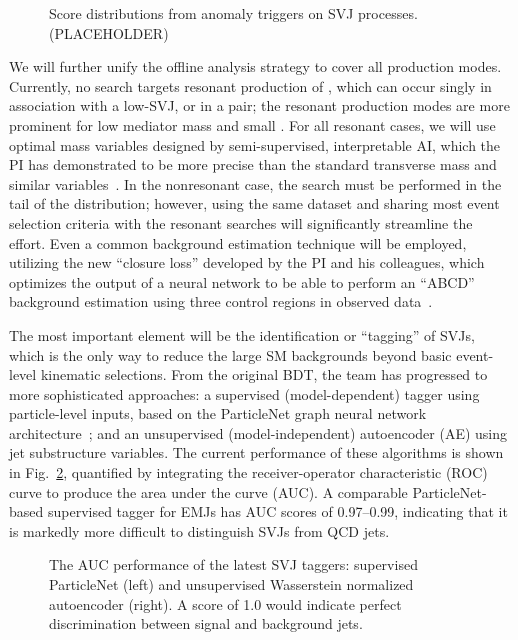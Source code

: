 \begin{figure}[htb!]
\centering
{}
\caption{Score distributions from anomaly triggers on SVJ processes. (PLACEHOLDER)}
\label{fig:svjanomaly}
\end{figure}

We will further unify the offline analysis strategy to cover all production modes.
Currently, no search targets resonant production of \Pbifun, which can occur singly in association with a low-\pt SVJ, or in a pair;
the resonant production modes are more prominent for low mediator mass and small \sbifun.
For all resonant cases, we will use optimal mass variables designed by semi-supervised, interpretable AI, which the PI has demonstrated to be more precise than the standard transverse mass and similar variables~\cite{Pedro:2023sdp}.
In the nonresonant case, the search must be performed in the tail of the \ptmiss distribution;
however, using the same dataset and sharing most event selection criteria with the resonant searches will significantly streamline the effort.
Even a common background estimation technique will be employed, utilizing the new ``closure loss'' developed by the PI and his colleagues,
which optimizes the output of a neural network to be able to perform an ``ABCD'' background estimation using three control regions in observed data~\cite{Crossman:2023aps}.

The most important element will be the identification or ``tagging'' of SVJs, which is the only way to reduce the large SM backgrounds beyond basic event-level kinematic selections.
From the original BDT, the team has progressed to more sophisticated approaches:
a supervised (model-dependent) tagger using particle-level inputs, based on the ParticleNet graph neural network architecture~\cite{Qu:2019gqs};
and an unsupervised (model-independent) autoencoder (AE) using jet substructure variables.
The current performance of these algorithms is shown in Fig.~\ref{fig:svjtaggers}, quantified by integrating the receiver-operator characteristic (ROC) curve to produce the area under the curve (AUC).
A comparable ParticleNet-based supervised tagger for EMJs has AUC scores of 0.97--0.99, indicating that it is markedly more difficult to distinguish SVJs from QCD jets.

\begin{figure}[htb!]
\centering
{}
\caption{The AUC performance of the latest SVJ taggers: supervised ParticleNet (left) and unsupervised Wasserstein normalized autoencoder (right).
A score of 1.0 would indicate perfect discrimination between signal and background jets.}
\label{fig:svjtaggers}
\end{figure}

